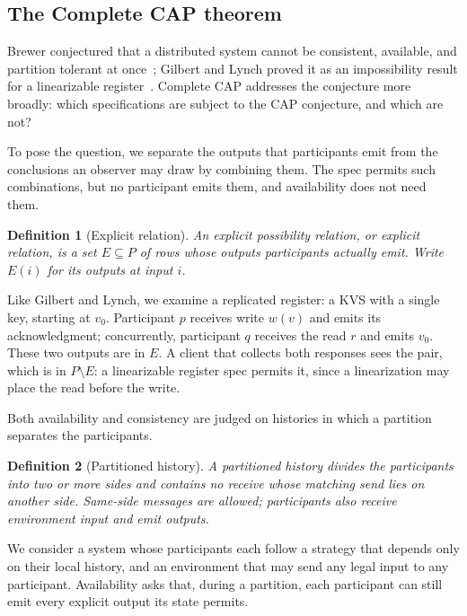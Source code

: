 \documentclass[sigconf]{cidr-2027}
\newtheorem{definition}{Definition}
\theoremstyle{remark}
\begin{document}
\subsection{The Complete CAP theorem}
\label{sec:complete-cap}

Brewer conjectured that a distributed system cannot be consistent, available,
and partition tolerant at once~\cite{brewer2000towards}; Gilbert and Lynch
proved it as an impossibility result for a linearizable register~\cite{gilbert2002cap}.
Complete CAP addresses the conjecture more broadly:
which specifications are subject to the CAP
conjecture, and which are not?

To pose the question, we separate the outputs that participants emit from
the conclusions an observer may draw by combining them.  The spec permits such combinations, but no participant emits them, and availability does not
need them.

\begin{definition}[Explicit relation]
\label{def:explicit-relation}
An \emph{explicit possibility relation}, or \emph{explicit relation}, is a set
$E\subseteq P$ of rows whose outputs participants actually emit.  Write $E(i)$
for its outputs at input $i$.
\end{definition}

Like Gilbert and Lynch, we examine a replicated register: a KVS
with a single key, starting at $v_0$.  Participant $p$ receives write $w(v)$
and emits its acknowledgment; concurrently, participant $q$ receives the read
$r$ and emits $v_0$.  These two outputs are in $E$.  A client that collects
both responses sees the pair, which is in $P\setminus E$: a linearizable
register spec permits it, since a linearization may place the read before the
write.

Both availability and consistency are judged on histories in which a partition
separates the participants.

\begin{definition}[Partitioned history]
\label{def:partitioned-history}
A \emph{partitioned history} divides the participants into two or more
sides and contains no receive whose matching send lies on another side.
Same-side messages are allowed; participants also receive environment
input and emit outputs.
\end{definition}

We consider a system whose participants each follow a strategy that depends
only on their local history, and an environment that may send any legal input
to any participant.  Availability asks that, during a partition, each
participant can still emit every explicit output its state permits.
\end{document}
